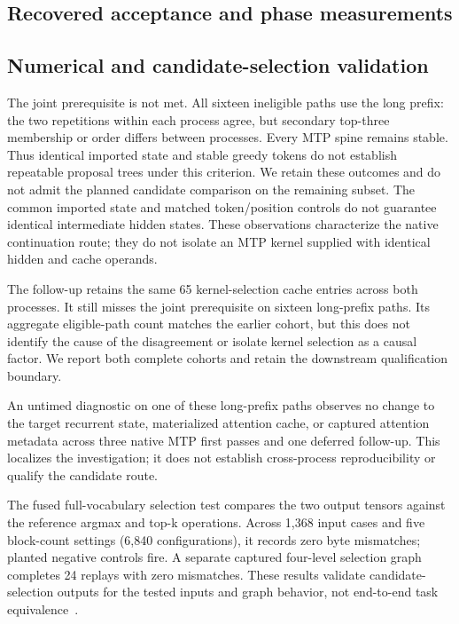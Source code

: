 \documentclass[conference]{IEEEtran}
\begin{document}
\subsection{Recovered acceptance and phase measurements}


\subsection{Numerical and candidate-selection validation}
\label{sec:current-validation}






The joint prerequisite is not met. All sixteen ineligible paths use the long
prefix: the two repetitions within each process agree, but secondary top-three
membership or order differs between processes. Every MTP spine remains stable.
Thus identical imported state and stable greedy tokens do not establish
repeatable proposal trees under this criterion. We retain these outcomes and
do not admit the planned candidate comparison on the remaining subset.
The common imported state and matched token/position controls do not guarantee
identical intermediate hidden states. These observations characterize the
native continuation route; they do not isolate an MTP kernel supplied with
identical hidden and cache operands.



The follow-up retains the same 65 kernel-selection cache entries across both
processes. It still misses the joint prerequisite on sixteen long-prefix
paths. Its aggregate eligible-path count matches the earlier cohort, but this
does not identify the cause of the disagreement or isolate kernel selection as
a causal factor. We report both complete cohorts and retain the downstream
qualification boundary.

An untimed diagnostic on one of these long-prefix paths observes no change to
the target recurrent state, materialized attention cache, or captured attention
metadata across three native MTP first passes and one deferred follow-up.
This localizes the investigation; it does not establish cross-process
reproducibility or qualify the candidate route.

The fused full-vocabulary selection test compares the two output tensors against the reference argmax and top-k operations. Across 1,368 input cases and five block-count settings (6,840 configurations), it records zero byte mismatches; planted negative controls fire. A separate captured four-level selection graph completes 24 replays with zero mismatches. These results validate candidate-selection outputs for the tested inputs and graph behavior, not end-to-end task equivalence~\cite{lumo2026archive}.
\end{document}

